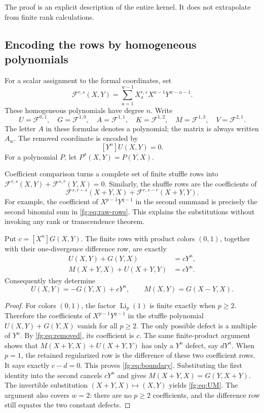 The proof is an explicit description of the entire kernel. It does not
extrapolate from finite rank calculations.

\subsection{Encoding the rows by homogeneous polynomials}

For a scalar assignment to the formal coordinates, set
\[
 \mathscr F^{r,s}(X,Y)
   =\sum_{a=1}^{w-1}X_a^{r,s}X^{a-1}Y^{w-a-1}.
\]
These homogeneous polynomials have degree $n$. Write
\[
 U=\mathscr F^{0,1},\quad G=\mathscr F^{1,0},\quad
 A=\mathscr F^{1,1},\quad K=\mathscr F^{1,2},\quad
 M=\mathscr F^{1,3},\quad V=\mathscr F^{2,1}.
\]
The letter $A$ in these formulas denotes a polynomial; the matrix is
always written $A_w$. The removed coordinate is encoded by
\begin{equation}\label{fg:eq:removed}
 [Y^n]U(X,Y)=0.
\end{equation}
For a polynomial $P$, let $P^\sigma(X,Y)=P(Y,X)$.

Coefficient comparison turns a complete set of finite stuffle rows into
$\mathscr F^{r,s}(X,Y)+\mathscr F^{s,r}(Y,X)=0$. Similarly, the shuffle
rows are the coefficients of
\[
 \mathscr F^{s,r-s}(X+Y,X)
   +\mathscr F^{r,s-r}(X+Y,Y).
\]
For example, the coefficient of $X^{p-1}Y^{q-1}$ in the second summand
is precisely the second binomial sum in
\eqref{fg:eq:raw-rows}. This explains the substitutions without invoking
any rank or transcendence theorem.

\begin{lemma}\label{fg:lem:boundary}
Put $c=[X^n]G(X,Y)$. The finite rows with product colors $(0,1)$,
together with their one-divergence difference row, are exactly
\begin{align}
 U(X,Y)+G(Y,X)&=cY^n,\\
 M(X+Y,X)+U(X+Y,Y)&=cY^n.
 \label{fg:eq:boundary}
\end{align}
Consequently they determine
\begin{equation}\label{fg:eq:UM}
 U(X,Y)=-G(Y,X)+cY^n,
 \qquad M(X,Y)=G(X-Y,X).
\end{equation}
\end{lemma}
\begin{proof}
For colors $(0,1)$, the factor $\operatorname{Li}_p(1)$ is finite
exactly when $p\ge2$. Therefore the coefficients of
$X^{p-1}Y^{q-1}$ in the stuffle polynomial
$U(X,Y)+G(Y,X)$ vanish for all $p\ge2$. The only possible defect is
a multiple of $Y^n$. By \eqref{fg:eq:removed}, its coefficient is $c$.
The same finite-product argument shows that
$M(X+Y,X)+U(X+Y,Y)$ has only a $Y^n$ defect, say $dY^n$.
When $p=1$, the retained regularized row is the difference of these
two coefficient rows. It says exactly $c-d=0$. This proves
\eqref{fg:eq:boundary}. Substituting the first identity into the
second cancels $cY^n$ and gives
$M(X+Y,X)=G(Y,X+Y)$. The invertible substitution
$(X+Y,X)\mapsto(X,Y)$ yields \eqref{fg:eq:UM}.
The argument also covers $w=2$: there are no $p\ge2$ coefficients,
and the difference row still equates the two constant defects.
\end{proof}


